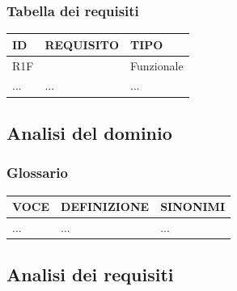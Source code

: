 \documentclass[a4paper, 11pt]{article}
\begin{document}
\newpage
\subsubsection{Tabella dei requisiti}

\begin{center}
    \begin{tabular}{ |p{2cm}|p{8cm}|p{2cm}|  }
        \hline
        \textbf{ID} & \textbf{REQUISITO} & \textbf{TIPO} \\ 
        \hline
        R1F &  & Funzionale \\
        \hline
        ... & ... & ... \\
        \hline
    \end{tabular}
\end{center}



\newpage
\subsection{Analisi del dominio}
\subsubsection{Glossario}

\begin{center}
    \begin{tabular}{ |p{3cm}|p{8cm}|p{3cm}|  }
        \hline
        \textbf{VOCE} & \textbf{DEFINIZIONE} & \textbf{SINONIMI} \\
        \hline
        ... & ... & ... \\
        \hline
        
    \end{tabular}
\end{center}



\newpage
\subsection{Analisi dei requisiti}
\end{document}
